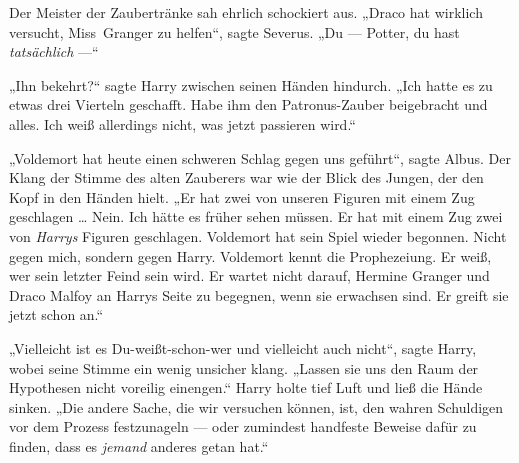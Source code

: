 Der Meister der Zaubertränke sah ehrlich schockiert aus.
„Draco hat wirklich versucht, Miss~Granger zu helfen“, sagte Severus.
„Du — Potter, du hast \emph{tatsächlich} —“

„Ihn bekehrt?“ sagte Harry zwischen seinen Händen hindurch.
„Ich hatte es zu etwas drei Vierteln geschafft. Habe ihm den Patronus-Zauber beigebracht und alles. Ich weiß allerdings nicht, was jetzt passieren wird.“

„Voldemort hat heute einen schweren Schlag gegen uns geführt“, sagte Albus. Der Klang der Stimme des alten Zauberers war wie der Blick des Jungen, der den Kopf in den Händen hielt.
„Er hat zwei von unseren Figuren mit einem Zug geschlagen … Nein. Ich hätte es früher sehen müssen. Er hat mit einem Zug zwei von \emph{Harrys} Figuren geschlagen. Voldemort hat sein Spiel wieder begonnen. Nicht gegen mich, sondern gegen Harry. Voldemort kennt die Prophezeiung. Er weiß, wer sein letzter Feind sein wird. Er wartet nicht darauf, Hermine Granger und Draco Malfoy an Harrys Seite zu begegnen, wenn sie erwachsen sind. Er greift sie jetzt schon an.“

„Vielleicht ist es Du-weißt-schon-wer und vielleicht auch nicht“, sagte Harry, wobei seine Stimme ein wenig unsicher klang.
„Lassen sie uns den Raum der Hypothesen nicht voreilig einengen.“ Harry holte tief Luft und ließ die Hände sinken.
„Die andere Sache, die wir versuchen können, ist, den wahren Schuldigen vor dem Prozess festzunageln — oder zumindest handfeste Beweise dafür zu finden, dass es \emph{jemand} anderes getan hat.“

